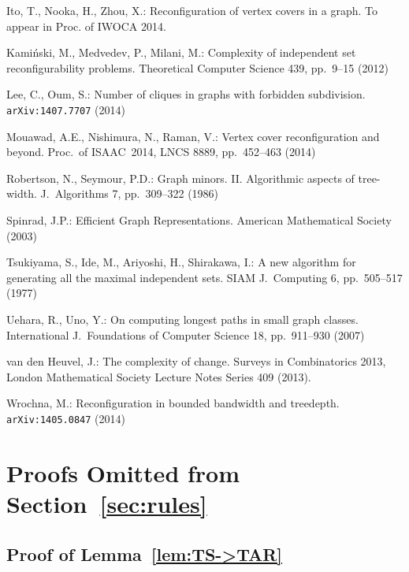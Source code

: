 \documentclass{llncs}
\begin{document}
\begin{thebibliography}{99}
Ito, T., Nooka, H., Zhou, X.:
Reconfiguration of vertex covers in a graph.
To appear in Proc. of IWOCA 2014. 

Kami\'nski, M., Medvedev, P., Milani, M.: 
Complexity of independent set reconfigurability problems.
Theoretical Computer Science 439, pp.~9--15 (2012)

Lee, C., Oum, S.:
Number of cliques in graphs with forbidden subdivision.
{\tt  arXiv:1407.7707} (2014)

Mouawad, A.E., Nishimura, N., Raman, V.: 
Vertex cover reconfiguration and beyond.
Proc.~of ISAAC~2014, LNCS 8889, pp.~452--463 (2014)

Robertson, N., Seymour, P.D.: 
Graph minors. I\hspace{-.1em}I. Algorithmic aspects of tree-width. 
J.~Algorithms 7, pp.~309--322 (1986)

Spinrad, J.P.:
Efficient Graph Representations.
American Mathematical Society (2003)

Tsukiyama, S., Ide, M., Ariyoshi, H., Shirakawa, I.:
A new algorithm for generating all the maximal independent sets.
SIAM J.~Computing 6, pp.~505--517 (1977)

Uehara, R., Uno, Y.:
On computing longest paths in small graph classes.
International J.~Foundations of Computer Science 18, pp.~911--930 (2007)

van den Heuvel, J.:
The complexity of change.
Surveys in Combinatorics 2013, 
London Mathematical Society Lecture Notes Series 409 (2013).

Wrochna, M.:
Reconfiguration in bounded bandwidth and treedepth.
{\tt  arXiv:1405.0847} (2014)

\end{thebibliography}

\newpage
\appendix

	\section{Proofs Omitted from Section~\ref{sec:rules}}
	
	\subsection{Proof of Lemma~\ref{lem:TS->TAR}}
\end{document}
